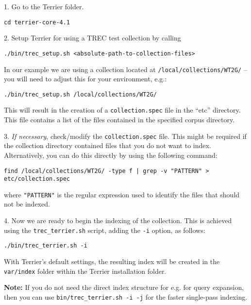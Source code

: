 1. Go to the Terrier folder.

\begin{verbatim}
cd terrier-core-4.1
\end{verbatim}

2. Setup Terrier for using a TREC test collection by calling

\begin{verbatim}
./bin/trec_setup.sh <absolute-path-to-collection-files>
\end{verbatim}

In our example we are using a collection located at
\texttt{/local/collections/WT2G/} -- you will need to adjust this for
your environment, e.g.:

\begin{verbatim}
./bin/trec_setup.sh /local/collections/WT2G/
\end{verbatim}

This will result in the creation of a \texttt{collection.spec} file in
the ``etc'' directory. This file contains a list of the files contained
in the specified corpus directory.

3. \emph{If necessary}, check/modify the \texttt{collection.spec} file.
This might be required if the collection directory contained files that
you do not want to index. Alternatively, you can do this directly by
using the following command:

\begin{verbatim}
find /local/collections/WT2G/ -type f | grep -v "PATTERN" > etc/collection.spec
\end{verbatim}

where \texttt{"PATTERN"} is the regular expression used to identify the
files that should not be indexed.

4. Now we are ready to begin the indexing of the collection. This is
achieved using the \texttt{trec\_terrier.sh} script, adding the
\texttt{-i} option, as follows:

\begin{verbatim}
./bin/trec_terrier.sh -i
\end{verbatim}

With Terrier's default settings, the resulting index will be created in
the \texttt{var/index} folder within the Terrier installation folder.

\textbf{Note:} If you do not need the direct index structure for e.g.
for query expansion, then you can use
\texttt{bin/trec\_terrier.sh\ -i\ -j} for the faster single-pass
indexing.

